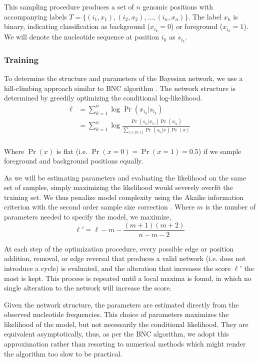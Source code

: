 \documentclass{bioinfo}
\begin{document}
This sampling procedure produces a set of $n$ genomic positions with
accompanying labels $T = \{ (i_1,x_1), (i_2,x_2), \dots, (i_n,x_n) \}$. The
label $x_k$ is binary, indicating classification as background ($x_{i_k} =
0$) or foreground ($x_{i_k} = 1$). We will denote the nucleotide sequence at
position $i_k$ as $s_{i_k}$.


\subsubsection{Training}

To determine the structure and parameters of the Bayesian network, we use a
hill-climbing approach similar to BNC algorithm \cite{Grossman2004}.
The network structure is determined by greedily optimizing the conditional
log-likelihood.
\begin{align*}
\ell &= \sum_{k=1}^{n} \log \Pr( x_{i_k} | s_{i_k} ) \\
&=
\sum_{k=1}^{n} \log \frac{ \Pr(s_{i_k} | x_{i_k}) \Pr( x_{i_k} ) }{
\sum_{x \in \{0,1\}} \Pr( s_{i_k} | x ) \Pr(x) } \\
\end{align*}

Where $\Pr(x)$ is flat (i.e.  $\Pr( x = 0 ) = \Pr( x = 1 ) =
0.5$) if we sample foreground and background positions equally.

As we will be estimating parameters and evaluating the likelihood on the same
set of samples, simply maximizing the likelihood would severely overfit the
training set. We thus penalize model complexity using the Akaike information
criterion with the second order sample size correction \cite{Hurvich1989}.
Where $m$ is the number of parameters needed to specify the model, we maximize,
$$ \ell' = \ell - m - \frac{(m + 1)(m + 2)}{n - m - 2} $$

At each step of the optimization procedure, every possible edge or position
addition, removal, or edge reversal that produces a valid network (i.e. does not
introduce a cycle) is evaluated, and the alteration that increases the score
$\ell'$ the most is kept.  This process is repeated until a local maxima is
found, in which no single alteration to the network will increase the score.

Given the network structure, the parameters are estimated directly from the
observed nucleotide frequencies. This choice of parameters maximizes the
likelihood of the model, but not necessarily the conditional likelihood. They
are equivalent asymptotically, thus, as per the BNC algorithm, we adopt this
approximation rather than  resorting to numerical methods which might render the
algorithm too slow to be practical.
\end{document}
